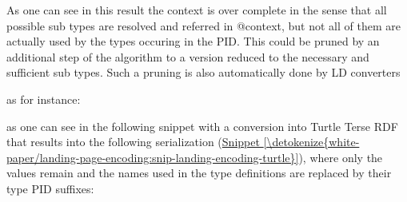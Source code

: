 \documentclass[a4paper,10pt,english]{sphinxmanual}
\begin{document}
\sphinxAtStartPar
As one can see in this result the context is over complete in the sense
that all possible sub types are resolved and referred in @context, but
not all of them are actually used by the types occuring in the PID. This
could be pruned by an additional step of the algorithm to a version
reduced to the necessary and sufficient sub types. Such a pruning is
also automatically done by LD converters%
\begin{footnote}[1]\sphinxAtStartFootnote
as for instance: 
%
\end{footnote} as one can
see in the following snippet with a conversion into Turtle Terse RDF
that results into the following serialization
(\hyperref[\detokenize{white-paper/landing-page-encoding:snip-landing-encoding-turtle}]{Snippet \ref{\detokenize{white-paper/landing-page-encoding:snip-landing-encoding-turtle}}}), where only the values remain
and the names used in the type definitions are replaced by their type
PID suffixes:
\def\sphinxLiteralBlockLabel{\label{\detokenize{white-paper/landing-page-encoding:snip-landing-encoding-turtle}}}
\end{document}

